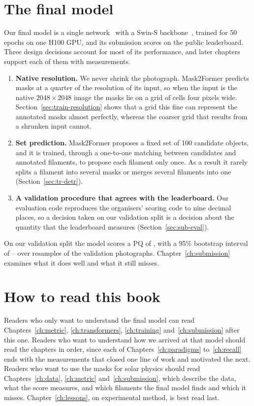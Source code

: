 \section{The final model}\label{sec:intro-winner}
Our final model is a single  network~\citep{mask2former} with a Swin-S
backbone~\citep{swin}, trained for 50 epochs on one H100 GPU, and its submission scores
\BestPublic{} on the public leaderboard. Three
design decisions account for most of its performance, and later chapters support each of them
with measurements.
\begin{enumerate}[leftmargin=*,itemsep=2pt]
\item \textbf{Native resolution.} We never shrink the photograph. Mask2Former predicts masks at a
quarter of the resolution of its input, so when the input is the native $2048\times2048$ image
the masks lie on a grid of cells four pixels wide. Section~\ref{sec:train-resolution} shows that a
grid this fine can represent the annotated masks almost perfectly, whereas the coarser grid that
results from a shrunken input cannot.
\item \textbf{Set prediction.} Mask2Former proposes a fixed set of 100 candidate objects, and it is
trained, through a one-to-one matching between candidates and annotated filaments, to propose each
filament only once. As a result it rarely splits a filament into several masks or merges several
filaments into one (Section~\ref{sec:tr-detr}).
\item \textbf{A validation procedure that agrees with the leaderboard.} Our evaluation code
reproduces the organisers' scoring code to nine decimal places, so a decision taken on our
validation split is a decision about the quantity that the leaderboard measures
(Section~\ref{sec:sub-eval}).
\end{enumerate}
On our validation split the model scores a PQ of \HostPQ{}, with a 95\% bootstrap interval of
\PQLow{}--\PQHigh{} over resamples of the validation photographs. Chapter~\ref{ch:submission}
examines what it does well and what it still misses.

\section{How to read this book}\label{sec:intro-read}
Readers who only want to understand the final model can read Chapters~\ref{ch:metric},
\ref{ch:transformers}, \ref{ch:training} and~\ref{ch:submission} after this one. Readers who want
to understand how we arrived at that model should read the chapters in order, since each of
Chapters~\ref{ch:paradigms} to~\ref{ch:recall} ends with the measurements that closed one line of
work and motivated the next. Readers who want to use the masks for solar physics should read
Chapters~\ref{ch:data}, \ref{ch:metric} and~\ref{ch:submission}, which describe the data, what the
score measures, and which filaments the final model finds and which it misses.
Chapter~\ref{ch:lessons}, on experimental method, is best read last.

